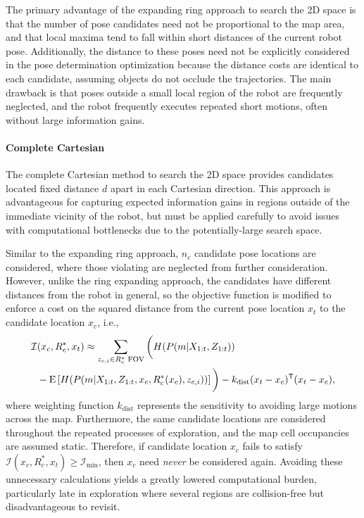 The primary advantage of the expanding ring approach to search the 2D space is that the number of pose candidates need not be proportional to the map area, and that local maxima tend to fall within short distances of the current robot pose. Additionally, the distance to these poses need not be explicitly considered in the pose determination optimization because the distance costs are identical to each candidate, assuming objects do not occlude the trajectories. The main drawback is that poses outside a small local region of the robot are frequently neglected, and the robot frequently executes repeated short motions, often without large information gains.

\paragraph{Complete Cartesian}
The complete Cartesian method to search the 2D space provides candidates located fixed distance $d$ apart in each Cartesian direction. This approach is advantageous for capturing expected information gains in regions outside of the immediate vicinity of the robot, but must be applied carefully to avoid issues with computational bottlenecks due to the potentially-large search space.

Similar to the expanding ring approach, $n_c$ candidate pose locations are considered, where those violating  are neglected from further consideration. However, unlike the ring expanding approach, the candidates have different distances from the robot in general, so the objective function is modified to enforce a cost on the squared distance from the current pose location $x_t$ to the candidate location $x_c$, i.e.,
\begin{align}
\label{eqn:ObjFunApproxCompleteCartesian}
\mathcal I&(x_c,R_c^*,x_t)\approx \sum_{z_{c,i}\in R_{c}^*\text{ FOV}}\bigg(H(P(m|X_{1:t},Z_{1:t}))\nonumber\\&-\text{E}\left[H(P(m|X_{1:t},Z_{1:t},x_c,R_c^*(x_c),z_{c,i}))\right]\bigg)-k_\text{dist}(x_t-x_c)^{\mathsf{T}}(x_t-x_c),
\end{align}
where weighting function $k_\text{dist}$ represents the sensitivity to avoiding large motions across the map. Furthermore, the same candidate locations are considered throughout the repeated processes of exploration, and the map cell occupancies are assumed static. Therefore, if candidate location $x_c$ fails to satisfy $\mathcal I(x_c,R_c^*,x_t)\geq\mathcal I_\text{min}$, then $x_c$ need \emph{never} be considered again. Avoiding these unnecessary calculations yields a greatly lowered computational burden, particularly late in exploration where several regions are collision-free but disadvantageous to revisit.


